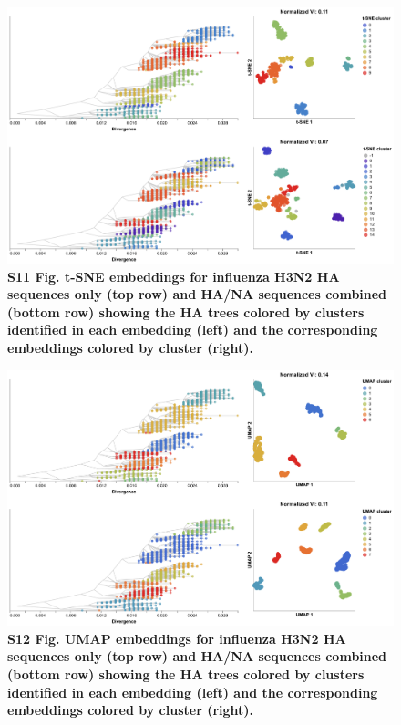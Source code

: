 \documentclass[10pt,letterpaper]{article}
\begin{document}
\begin{figure}[!h]
\includegraphics[width=\columnwidth]{figures/flu-2016-2018-ha-na-tsne-by-cluster.png}
\caption*{{\bf S11 Fig. t-SNE embeddings for influenza H3N2 HA sequences only (top row) and HA/NA sequences combined (bottom row) showing the HA trees colored by clusters identified in each embedding (left) and the corresponding embeddings colored by cluster (right).}}
\end{figure}

\begin{figure}[!h]
\includegraphics[width=\columnwidth]{figures/flu-2016-2018-ha-na-umap-by-cluster.png}
\caption*{{\bf S12 Fig. UMAP embeddings for influenza H3N2 HA sequences only (top row) and HA/NA sequences combined (bottom row) showing the HA trees colored by clusters identified in each embedding (left) and the corresponding embeddings colored by cluster (right).}}
\end{figure}
\end{document}
